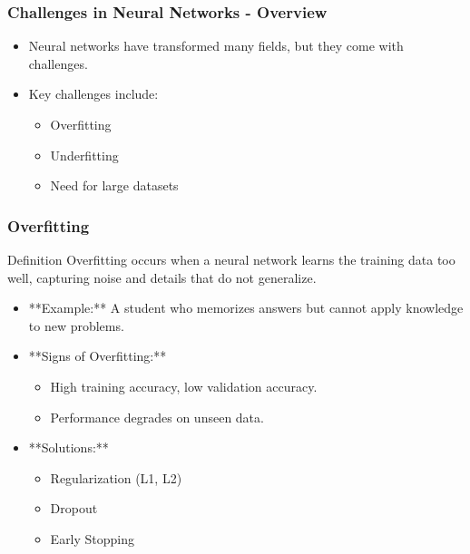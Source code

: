 \documentclass[aspectratio=169]{beamer}
\begin{document}
\begin{frame}[fragile]
    \frametitle{Challenges in Neural Networks - Overview}
    \begin{itemize}
        \item Neural networks have transformed many fields, but they come with challenges.
        \item Key challenges include:
        \begin{itemize}
            \item Overfitting
            \item Underfitting
            \item Need for large datasets
        \end{itemize}
    \end{itemize}
\end{frame}

\begin{frame}[fragile]
    \frametitle{Overfitting}
    \begin{block}{Definition}
        Overfitting occurs when a neural network learns the training data too well, capturing noise and details that do not generalize.
    \end{block}
    \begin{itemize}
        \item **Example:** 
        A student who memorizes answers but cannot apply knowledge to new problems.
        
        \item **Signs of Overfitting:**
        \begin{itemize}
            \item High training accuracy, low validation accuracy.
            \item Performance degrades on unseen data.
        \end{itemize}
        
        \item **Solutions:**
        \begin{itemize}
            \item Regularization (L1, L2)
            \item Dropout
            \item Early Stopping
        \end{itemize}
    \end{itemize}
\end{frame}
\end{document}

